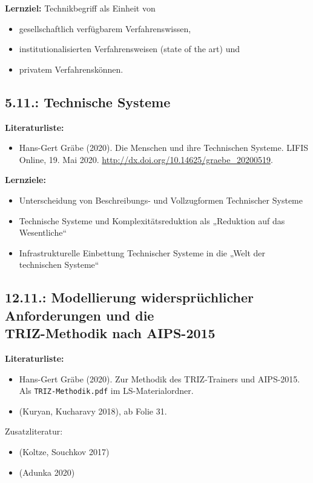 \documentclass[11pt,a4paper]{article}
\begin{document}
\textbf{Lernziel:}
Technikbegriff als Einheit von 
\begin{itemize}[noitemsep]
\item gesellschaftlich verfügbarem Verfahrenswissen,
\item institutionalisierten Verfahrensweisen (state of the art) und
\item privatem Verfahrenskönnen.
\end{itemize}

\subsection{5.11.: Technische Systeme}

\textbf{Literaturliste:}
\begin{itemize}[noitemsep]
\item Hans-Gert Gräbe (2020). Die Menschen und ihre Technischen Systeme. LIFIS
  Online, 19. Mai 2020. \url{http://dx.doi.org/10.14625/graebe_20200519}.
\end{itemize}

\textbf{Lernziele:}
\begin{itemize}[noitemsep]
\item Unterscheidung von Beschreibungs- und Vollzugformen Technischer Systeme
\item Technische Systeme und Komplexitätsreduktion als „Reduktion auf das
  Wesentliche“
\item Infrastrukturelle Einbettung Technischer Systeme in die „Welt der
  technischen Systeme“
\end{itemize}

\subsection{12.11.: Modellierung widersprüchlicher Anforderungen und die\\
  TRIZ-Methodik nach AIPS-2015}

\textbf{Literaturliste:}
\begin{itemize}[noitemsep]
\item Hans-Gert Gräbe (2020). Zur Methodik des TRIZ-Trainers und AIPS-2015.\\ 
  Als \texttt{TRIZ-Methodik.pdf} im LS-Materialordner.
\item (Kuryan, Kucharavy 2018), ab Folie 31.
\end{itemize}
Zusatzliteratur:
\begin{itemize}[noitemsep]
\item (Koltze, Souchkov 2017)
\item (Adunka 2020)
\end{itemize}
\end{document}
